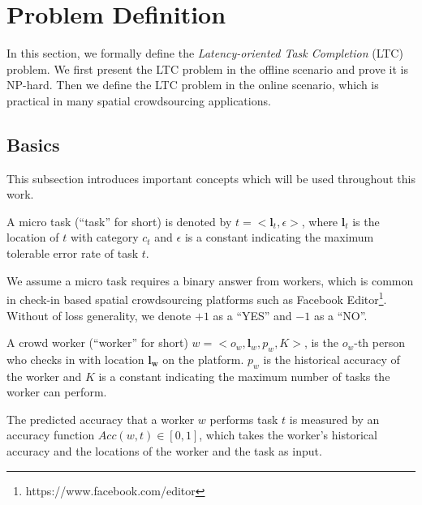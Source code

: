 \section{Problem Definition}
\label{sec:definition}
In this section, we formally define the \textit{Latency-oriented Task Completion} (LTC) problem.
We first present the LTC problem in the offline scenario and prove it is NP-hard.
Then we define the LTC problem in the online scenario, which is practical in many spatial crowdsourcing applications.

\subsection{Basics}
This subsection introduces important concepts which will be used throughout this work.

\begin{definition}
\label{def:task}
A micro task (``task'' for short) is denoted by $t = <\boldsymbol{l}_t, \epsilon>$, where $\boldsymbol{l}_t$ is the location of $t$ with category $c_t$ and $\epsilon$ is a constant indicating the maximum tolerable error rate of task $t$.
\end{definition}

We assume a micro task requires a binary answer from workers, which is common in check-in based spatial crowdsourcing platforms such as Facebook Editor\footnote{https://www.facebook.com/editor}.
Without of loss generality, we denote $+1$ as a ``YES'' and $-1$ as a ``NO''.

\begin{definition}
\label{def:worker}
A crowd worker (``worker'' for short) $w = <o_w, \boldsymbol{l}_w, p_w, K>$, is the $o_w$-th person who checks in with location $\boldsymbol{l_w}$ on the platform.
$p_w$ is the historical accuracy of the worker and $K$ is a constant indicating the maximum number of tasks the worker can perform.
\end{definition}


\begin{definition}
\label{def:acc}
The predicted accuracy that a worker $w$ performs task $t$ is measured by an accuracy function $Acc(w, t) \in [0,1]$, which takes the worker's historical accuracy and the locations of the worker and the task as input.
\end{definition}

